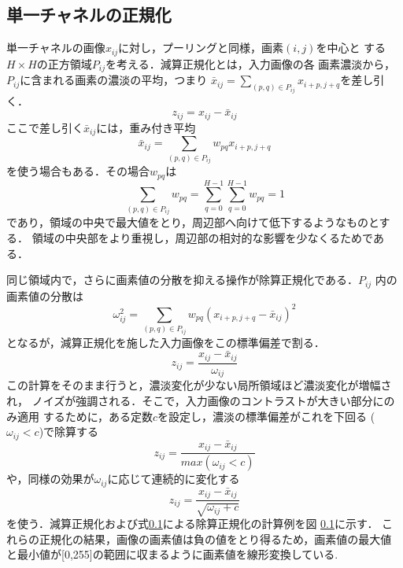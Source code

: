 \documentclass[a4paper,10pt]{jsarticle}
\begin{document}
\subsection{単一チャネルの正規化}
単一チャネルの画像$x_{ij}$に対し，プーリングと同様，画素$(i,j)$を中心と
する$H\times H$の正方領域$P_{ij}$を考える．減算正規化とは，入力画像の各
画素濃淡から，$P_{ij}$に含まれる画素の濃淡の平均，つまり
$\bar{x}_{ij}= \sum_{(p,q)\in{P_{ij}}}^{} x_{i+p,j+q}$を差し引く．
\begin{equation}
 z_{ij} = x_{ij}-\bar{x}_{ij}
\end{equation}
ここで差し引く$\bar{x}_{ij}$には，重み付き平均
\begin{equation}
 \bar{x}_{ij}=\sum_{(p,q)\in{P_{ij}}} w_{pq}x_{i+p,j+q}
\end{equation}
を使う場合もある．その場合$w_{pq}$は
\begin{equation}
  \sum_{(p,q)\in{P_{ij}}}^{} w_{pq} = \sum_{q=0}^{H-1} \sum_{q=0}^{H-1} w_{pq}=1
\end{equation}
であり，領域の中央で最大値をとり，周辺部へ向けて低下するようなものとする．
領域の中央部をより重視し，周辺部の相対的な影響を少なくるためである．

同じ領域内で，さらに画素値の分散を抑える操作が除算正規化である．$P_{ij}$
内の画素値の分散は
\begin{equation}
 \omega^2_{ij}=\sum_{(p,q)\in{P_{ij}}}^{} w_{pq}(x_{i+p,j+q}-\bar{x}_{ij})^2
\end{equation}
となるが，減算正規化を施した入力画像をこの標準偏差で割る．
\begin{equation}
 z_{ij}=\frac{x_{ij}-\bar{x}_{ij}}{\omega_{ij}}
\end{equation}
この計算をそのまま行うと，濃淡変化が少ない局所領域ほど濃淡変化が増幅され，
ノイズが強調される．そこで，入力画像のコントラストが大きい部分にのみ適用
するために，ある定数$c$を設定し，濃淡の標準偏差がこれを下回る
($\omega_{ij}<c$)で除算する
\begin{equation}
 z_{ij}=\frac{x_{ij}-\bar{x}_{ij}}{max(\omega_{ij}<c)}
\end{equation}
や，同様の効果が$\omega_{ij}$に応じて連続的に変化する
\begin{equation}
 z_{ij}=\frac{x_{ij}-\bar{x}_{ij}}{\sqrt{\omega_{ij}+c}}
\end{equation}
を使う．減算正規化および式\ref{}による除算正規化の計算例を図
\ref{}に示す．
これらの正規化の結果，画像の画素値は負の値をとり得るため，画素値の最大値
と最小値が[0,255]の範囲に収まるように画素値を線形変換している.
\end{document}
